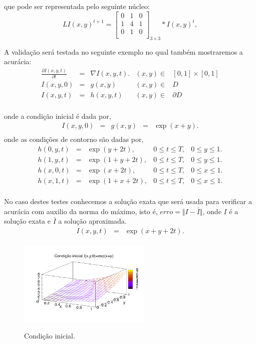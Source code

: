 \documentclass[a4paper]{article} %
\begin{document}
que pode ser representada pelo seguinte núcleo:
$$L I(x,y)^{t+1}=\left[
\begin{array}{lrl}
 0 &  1 & 0\\
 1 &  4 & 1\\
 0 &  1 & 0\\
\end{array}
\right]_{3 \times 3}* I(x,y)^{t},$$

A validação será testada no seguinte exemplo no qual também mostraremos a acurácia:
\begin{equation}
\begin{array}{lllll}
	\frac{\partial I(x,y,t)}{\partial t}&=&\nabla I(x,y,t). &(x,y)\in&[0,1]\times[0,1]\\ 
	I(x,y,0)& = & g(x,y) & (x,y)\in & D\\
	I(x,y,t)& = & h(x,y,t) & (x,y)\in&\partial D\\
\end{array}\label{equa1:3}
\end{equation}

onde a condição inicial é dada por,
\begin{equation}
\begin{array}{lllll}
	I(x,y,0)&=&g(x,y)& = & \exp(x+y). \\
\end{array}\label{equa1:4}
\end{equation}
onde as condições de contorno são dadas por,
\begin{equation}
\begin{array}{lllll}
	h(0,y,t)& = &\exp(y+2t),  & 0\leq t \leq T,&0\leq y \leq 1 . \\
	h(1,y,t)& = &\exp(1 + y + 2t),  & 0\leq t \leq T,&0\leq y \leq 1 . \\
	h(x,0,t)& = &\exp(x+2t),  & 0\leq t \leq T,&0\leq x \leq 1 . \\
	h(x,1,t)& = &\exp(1+x+2t),  & 0\leq t \leq T,&0\leq x \leq 1 . \\
\end{array}\label{equa1:5}
\end{equation}


No caso destes testes conhecemos a solução exata que será usada para verificar a acurácia com auxilio da norma do máximo, isto é, $erro=\Vert I-\bar{I}\Vert$, onde $I$ é a solução exata e $\bar{I}$ a solução aproximada.
\begin{equation}
\begin{array}{lll}
	I(x,y,t)& = & \exp(x+y+2t). \\
\end{array}\label{equa1:4}
\end{equation}
\begin{figure}[!htb]
\centering
\includegraphics[width=2.5in]{cond_inic.png}
\label{fig5}
\caption{Condição inicial.}
\end{figure}
\end{document}
